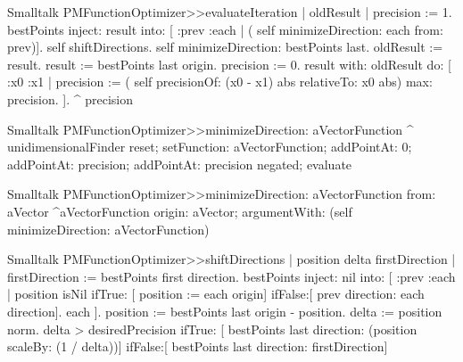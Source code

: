\begin{displaycode}{Smalltalk}
PMFunctionOptimizer>>evaluateIteration
    | oldResult |
    precision := 1.
    bestPoints inject: result
                 into: [ :prev :each | ( self minimizeDirection: each
                                                         from: prev)].
    self shiftDirections.
    self minimizeDirection: bestPoints last.
    oldResult := result.
    result := bestPoints last origin.
    precision := 0.
    result with: oldResult do:
        [ :x0 :x1 |
          precision := ( self precisionOf: (x0 - x1) abs relativeTo:
                                               x0 abs) max: precision.
        ].
    ^ precision
\end{displaycode}

\begin{displaycode}{Smalltalk}
PMFunctionOptimizer>>minimizeDirection: aVectorFunction
    ^ unidimensionalFinder
        reset;
        setFunction: aVectorFunction;
        addPointAt: 0;
        addPointAt: precision;
        addPointAt: precision negated;
        evaluate
\end{displaycode}

\begin{displaycode}{Smalltalk}
PMFunctionOptimizer>>minimizeDirection: aVectorFunction from: aVector
    ^aVectorFunction
        origin: aVector;
        argumentWith: (self minimizeDirection: aVectorFunction)
\end{displaycode}

\begin{displaycode}{Smalltalk}
PMFunctionOptimizer>>shiftDirections
    | position delta firstDirection |
    firstDirection := bestPoints first direction.
    bestPoints inject: nil
                    into: [ :prev :each |
                            position isNil
                                ifTrue: [ position := each origin]
                                ifFalse:[ prev direction: each
                                                           direction].
                            each
                            ].
    position := bestPoints last origin - position.
    delta := position norm.
    delta > desiredPrecision
        ifTrue: [ bestPoints last direction: (position scaleBy: (1 /
                                                              delta))]
        ifFalse:[ bestPoints last direction: firstDirection]
\end{displaycode}


